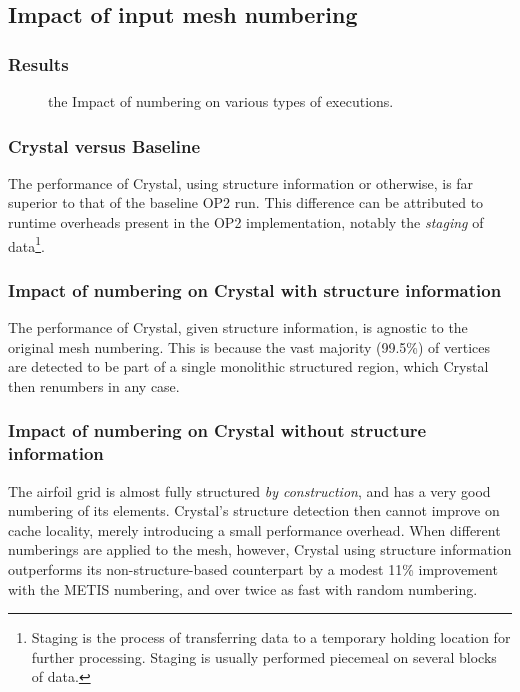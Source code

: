 \subsection{Impact of input mesh numbering}
\subsubsection{Results}
\begin{figure}
  \centering
  
\caption{the Impact of numbering on various types of executions.}
\label{fig:plot-airfoil-numbering}
\end{figure}

\subsubsection{Crystal versus Baseline}
The performance of Crystal, using structure information or otherwise, is far superior to that of the baseline OP2 run. This difference can be attributed to runtime overheads present in the OP2 implementation, notably the \emph{staging} of data\footnote{Staging is the process of transferring data to a temporary holding location for further processing. Staging is usually performed piecemeal on several blocks of data.}.

\subsubsection{Impact of numbering on Crystal with structure information}
The performance of Crystal, given structure information, is agnostic to the original mesh numbering. This is because the vast majority (99.5\%) of vertices are detected to be part of a single monolithic structured region, which Crystal then renumbers in any case.

\subsubsection{Impact of numbering on Crystal without structure information}
The airfoil grid is almost fully structured \emph{by construction}, and has a very good numbering of its elements. Crystal's structure detection then cannot improve on cache locality, merely introducing a small performance overhead. When different numberings are applied to the mesh, however, Crystal using structure information outperforms its non-structure-based counterpart by a modest 11\% improvement with the METIS numbering, and over twice as fast with random numbering.


